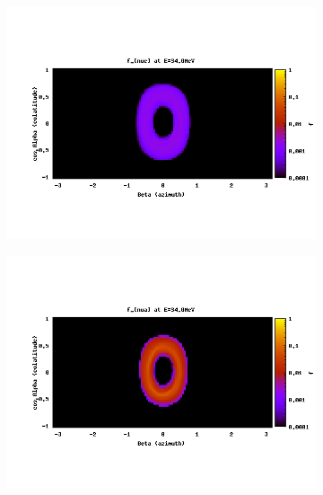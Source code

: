 \begin{figure}
  \centering
  \begin{subfigure}{.3\textwidth}
    \centering
    \includegraphics[width=1\linewidth]{Figures/f_nue-A-34MeV}
  \end{subfigure}
  \begin{subfigure}{.3\textwidth}
    \centering
    \includegraphics[width=1\linewidth]{Figures/f_nua-A-34MeV}
  \end{subfigure}
  \begin{subfigure}{.3\textwidth}
    \centering

\end{subfigure}
\end{figure}
